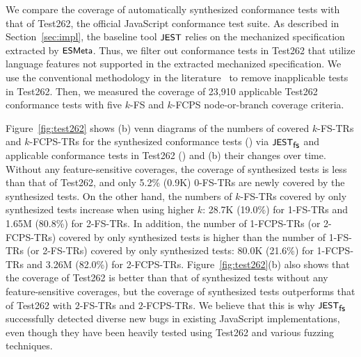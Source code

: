 
We compare the coverage of automatically synthesized conformance tests with that
of Test262, the official JavaScript conformance test suite.
As described in Section~\ref{sec:impl}, the baseline tool $\textsf{\small JEST}$ relies on the
mechanized specification extracted by $\textsf{\small ESMeta}$.
Thus, we filter out conformance tests in Test262 that utilize language
features not supported in the extracted mechanized specification.
We use the conventional methodology in the literature~\cite{kjs, jiset, javert}
to remove inapplicable tests in Test262.
Then, we measured the coverage of 23,910 applicable Test262 conformance tests
with five $k$-FS and $k$-FCPS node-or-branch coverage criteria.


Figure~\ref{fig:test262} shows
(b) venn diagrams of
the numbers of covered $k$-FS-TRs and 
$k$-FCPS-TRs for the synthesized conformance tests () via
$\textsf{\small JEST}_{\textsf{\small fs}}$ and applicable conformance tests in Test262 () and
(b) their changes over time.
Without any feature-sensitive coverages, the coverage of synthesized tests is
less than that of Test262, and only 5.2\% (0.9K) 0-FS-TRs are newly covered by
the synthesized tests.
%
On the other hand, the numbers of $k$-FS-TRs covered by only synthesized tests
increase when using higher $k$: 28.7K (19.0\%) for 1-FS-TRs and 1.65M (80.8\%)
for 2-FS-TRs.
%
In addition, the number of 1-FCPS-TRs (or 2-FCPS-TRs) covered by only
synthesized tests is higher than the number of 1-FS-TRs (or 2-FS-TRs)
covered by only synthesized tests:
80.0K (21.6\%) for 1-FCPS-TRs and 3.26M (82.0\%) for 2-FCPS-TRs.
Figure~\ref{fig:test262}(b) also shows that the coverage of Test262 is
better than that of synthesized tests without any feature-sensitive
coverages, but the coverage of synthesized tests outperforms that of
Test262 with $2$-FS-TRs and $2$-FCPS-TRs.
%
We believe that this is why $\textsf{\small JEST}_{\textsf{\small fs}}$ successfully detected diverse new bugs in
existing JavaScript implementations, even though they have been heavily tested
using Test262 and various fuzzing techniques.
